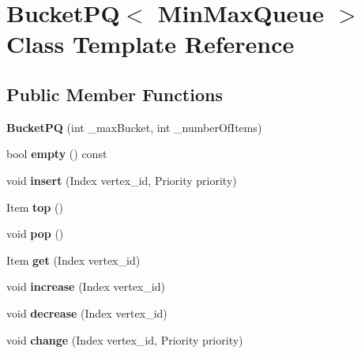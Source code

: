 \hypertarget{classBucketPQ}{
\section{BucketPQ$<$ MinMaxQueue $>$ Class Template Reference}
\label{classBucketPQ}
}
\subsection*{Public Member Functions}
\begin{DoxyCompactItemize}
\item 
\hypertarget{classBucketPQ_a9f9ee7403058a116f4cc71265a24a6ec}{
{\bfseries BucketPQ} (int \_\-maxBucket, int \_\-numberOfItems)}
\label{classBucketPQ_a9f9ee7403058a116f4cc71265a24a6ec}

\item 
\hypertarget{classBucketPQ_a26a0a7623213a531dc485b479788bbd0}{
bool {\bfseries empty} () const }
\label{classBucketPQ_a26a0a7623213a531dc485b479788bbd0}

\item 
\hypertarget{classBucketPQ_a9a6f9fb1dc309b9abacbc846bb07ab9e}{
void {\bfseries insert} (Index vertex\_\-id, Priority priority)}
\label{classBucketPQ_a9a6f9fb1dc309b9abacbc846bb07ab9e}

\item 
\hypertarget{classBucketPQ_a3dde89127ed03fc51868b7d2aed90558}{
Item {\bfseries top} ()}
\label{classBucketPQ_a3dde89127ed03fc51868b7d2aed90558}

\item 
\hypertarget{classBucketPQ_abae85af7fccf22c3cc5448321385d2a4}{
void {\bfseries pop} ()}
\label{classBucketPQ_abae85af7fccf22c3cc5448321385d2a4}

\item 
\hypertarget{classBucketPQ_af12cf8b307eaf681b42f1d9845ba303f}{
Item {\bfseries get} (Index vertex\_\-id)}
\label{classBucketPQ_af12cf8b307eaf681b42f1d9845ba303f}

\item 
\hypertarget{classBucketPQ_a8112720b754173aefa8dc7bc60c6cb8a}{
void {\bfseries increase} (Index vertex\_\-id)}
\label{classBucketPQ_a8112720b754173aefa8dc7bc60c6cb8a}

\item 
\hypertarget{classBucketPQ_a2a83c56c6ab339b02595e29a8618ac1d}{
void {\bfseries decrease} (Index vertex\_\-id)}
\label{classBucketPQ_a2a83c56c6ab339b02595e29a8618ac1d}

\item 
\hypertarget{classBucketPQ_a901b7e69550fb03b4720a6ffc81110e2}{
void {\bfseries change} (Index vertex\_\-id, Priority priority)}
\label{classBucketPQ_a901b7e69550fb03b4720a6ffc81110e2}


\end{DoxyCompactItemize}
